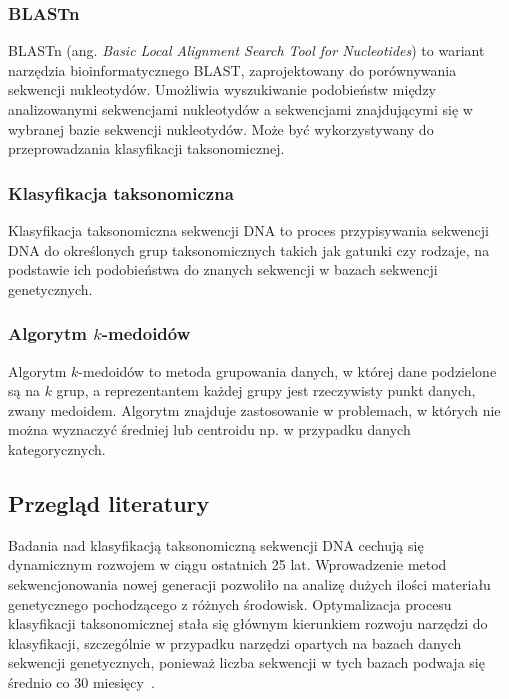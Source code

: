             \subsubsection{BLASTn}
            
                BLASTn (ang. \textit{Basic Local Alignment Search Tool for Nucleotides}) to wariant narzędzia bioinformatycznego BLAST, zaprojektowany do porównywania sekwencji nukleotydów. Umożliwia wyszukiwanie podobieństw między analizowanymi sekwencjami nukleotydów a sekwencjami znajdującymi się w wybranej bazie sekwencji nukleotydów. Może być wykorzystywany do przeprowadzania klasyfikacji taksonomicznej.

        \subsubsection{Klasyfikacja taksonomiczna}

            Klasyfikacja taksonomiczna sekwencji DNA to proces przypisywania sekwencji DNA do określonych grup taksonomicznych takich jak gatunki czy rodzaje, na podstawie ich podobieństwa do znanych sekwencji w bazach sekwencji genetycznych.

        \subsubsection{Algorytm $k$-medoidów}

            Algorytm $k$-medoidów to metoda grupowania danych, w której dane podzielone są na $k$ grup, a reprezentantem każdej grupy jest rzeczywisty punkt danych, zwany medoidem. Algorytm znajduje zastosowanie w problemach, w których nie można wyznaczyć średniej lub centroidu np. w przypadku danych kategorycznych.

    \subsection{Przegląd literatury}

        Badania nad klasyfikacją taksonomiczną sekwencji DNA cechują się dynamicznym rozwojem w ciągu ostatnich 25 lat. Wprowadzenie metod sekwencjonowania nowej generacji pozwoliło na analizę dużych ilości materiału genetycznego pochodzącego z różnych środowisk. Optymalizacja procesu klasyfikacji taksonomicznej stała się głównym kierunkiem rozwoju narzędzi do klasyfikacji, szczególnie w przypadku narzędzi opartych na bazach danych sekwencji genetycznych, ponieważ liczba sekwencji w tych bazach podwaja się średnio co 30 miesięcy~\cite{Benson:2008}.

